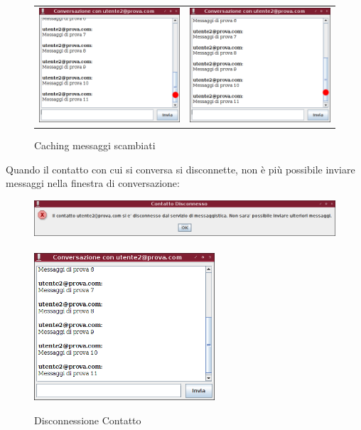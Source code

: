 \documentclass[a4paper, 11pt]{article} %
\begin{document}
\begin{figure}[H]
\hspace{-2.0cm}
\begin{tabular}{cc}
  \includegraphics[width=80mm]{images/client-8.png} & \includegraphics[width=80mm]{images/client-9.png}
\end{tabular}
\vspace{-0.5cm}
\caption{Caching messaggi scambiati}
\end{figure}
Quando il contatto con cui si conversa si disconnette, non \`e pi\`u possibile inviare messaggi nella finestra di conversazione:
\begin{figure}[H]
\includegraphics[width=1.2\textwidth]{images/client-10.png}
\\
\\
\includegraphics[width=0.6\textwidth]{images/client-11.png}
\vspace{-0.2cm}
\caption{Disconnessione Contatto}
\end{figure}
\end{document}
